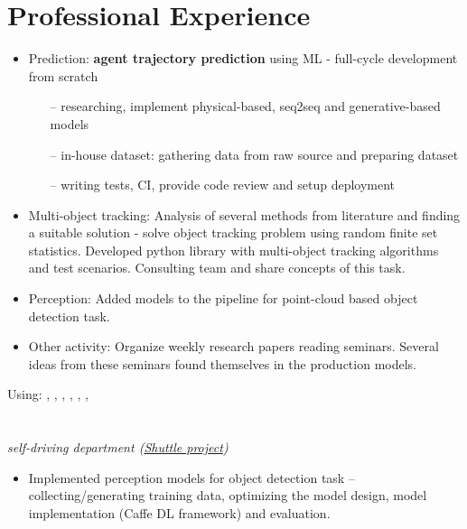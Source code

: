\section*{Professional Experience}
% 
\begin{itemize}
    \item Prediction: \textbf{agent trajectory prediction} using ML - full-cycle development from scratch
          \begin{itemize}
              \item[--] researching, implement physical-based, seq2seq and generative-based models
              \item[--] in-house dataset: gathering data from raw source and preparing dataset
              \item[--] writing tests, CI, provide code review and setup deployment
          \end{itemize}
    \item Multi-object tracking: Analysis of several methods from literature and finding a suitable solution - solve object tracking problem using random finite set statistics. Developed python library with multi-object tracking algorithms and test scenarios. Consulting team and share concepts of this task.
    \item Perception: Added models to the pipeline for point-cloud based object detection task.
    \item Other activity: Organize weekly research papers reading seminars. Several ideas from these seminars found themselves in the production models.
\end{itemize}
Using: , , , , , , \\
\pagebreak
\\
% 
 \\
\textit{self-driving department (\href{https://www.engadget.com/2016/08/28/yandex-teams-on-self-driving-shuttle-bus/}{Shuttle project})}
\begin{itemize}
    \item Implemented perception models for object detection task -- collecting/generating training data, optimizing the model design, model implementation (Caffe DL framework) and evaluation.
\end{itemize}
